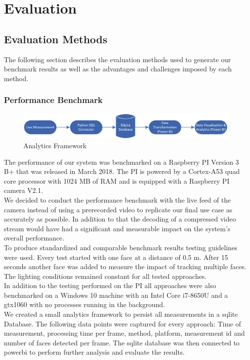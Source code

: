 \chapter{Evaluation}
\section{Evaluation Methods}
The following section describes the evaluation methods used to generate our benchmark results as well as the advantages and challenges imposed by each method.
\subsection{Performance Benchmark}
\begin{figure}[H]
  \centering
  \includegraphics[width=\columnwidth]{media/diagram_reporting.jpg}
  \caption{Analytics Framework}
\end{figure}
The performance of our system was benchmarked on a Raspberry PI Version 3 B+ that was released in March 2018. The PI is powered by a Cortex-A53 quad core processor with 1024 MB of RAM and is equipped with a Raspberry PI camera V2.1.\\
We decided to conduct the performance benchmark with the live feed of the camera instead of using a prerecorded video to replicate our final use case as accurately as possible. In addition to that the decoding of a compressed video stream would have had a significant and measurable impact on the system's overall performance.\\
To produce standardized and comparable benchmark results testing guidelines were used. Every test started with one face at a distance of 0.5 m. After 15 seconds another face was added to measure the impact of tracking multiple faces.
The lighting conditions remained constant for all tested approaches.\\
In addition to the testing performed on the PI all approaches were also benchmarked on a Windows 10 machine with an Intel Core i7-8650U and a \gls{gtx1060} with no processes running in the background.\\
We created a small analytics framework to persist all measurements in a \gls{sqlite} Database. The following data points were captured for every approach: Time of measurement, processing time per frame, method, platform, measurement id and number of faces detected per frame. The \gls{sqlite} database was then connected to \gls{powerbi} to perform further analysis and evaluate the results.
